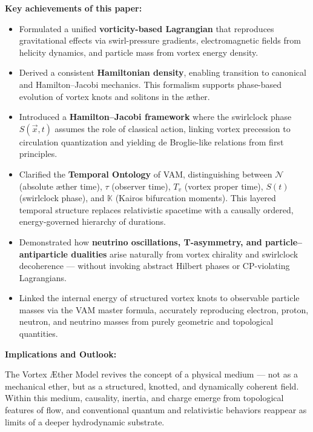 \documentclass[preprint]{revtex4-2}
\begin{document}
\vspace{0.5em}
\noindent
\textbf{Key achievements of this paper:}
\begin{itemize}
    \item Formulated a unified \textbf{vorticity-based Lagrangian} that reproduces gravitational effects via swirl-pressure gradients, electromagnetic fields from helicity dynamics, and particle mass from vortex energy density.

    \item Derived a consistent \textbf{Hamiltonian density}, enabling transition to canonical and Hamilton--Jacobi mechanics. This formalism supports phase-based evolution of vortex knots and solitons in the æther.

    \item Introduced a \textbf{Hamilton--Jacobi framework} where the swirlclock phase $S(\vec{x}, t)$ assumes the role of classical action, linking vortex precession to circulation quantization and yielding de Broglie-like relations from first principles.

    \item Clarified the \textbf{Temporal Ontology} of VAM, distinguishing between $\mathcal{N}$ (absolute æther time), $\tau$ (observer time), $T_v$ (vortex proper time), $S(t)$ (swirlclock phase), and $\mathbb{K}$ (Kairos bifurcation moments). This layered temporal structure replaces relativistic spacetime with a causally ordered, energy-governed hierarchy of durations.

    \item Demonstrated how \textbf{neutrino oscillations, T-asymmetry, and particle–antiparticle dualities} arise naturally from vortex chirality and swirlclock decoherence — without invoking abstract Hilbert phases or CP-violating Lagrangians.

    \item Linked the internal energy of structured vortex knots to observable particle masses via the VAM master formula, accurately reproducing electron, proton, neutron, and neutrino masses from purely geometric and topological quantities.
\end{itemize}

\vspace{0.5em}
\noindent
\textbf{Implications and Outlook:}

The Vortex \AE{}ther Model revives the concept of a physical medium — not as a mechanical ether, but as a structured, knotted, and dynamically coherent field. Within this medium, causality, inertia, and charge emerge from topological features of flow, and conventional quantum and relativistic behaviors reappear as limits of a deeper hydrodynamic substrate.
\end{document}
